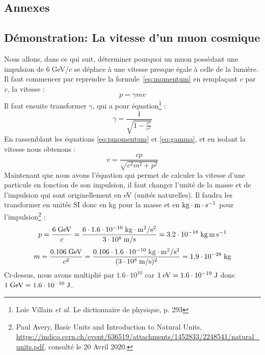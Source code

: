 \documentclass[a4paper, 12pt]{article}
\begin{document}
\begin{spacing}{1.5}
\pagebreak
\appendix
\section{Annexes}

\subsection{Démonstration: La vitesse d'un muon cosmique}
\label{annexe 1}

Nous allons, dans ce qui suit, déterminer pourquoi un muon possèdant une impulsion de $6\;$GeV/$c$ se déplace à une vitesse presque égale à celle de la lumière. Il faut commencer par reprendre la formule~\ref{eq:momentum} en remplaçant $c$ par $v$, la vitesse :
\begin{equation}
p = \gamma mv \label{eq:pmomentum}
\end{equation}
Il faut ensuite transformer $\gamma$, qui a pour équation\footnote{Loïc Villain \emph{et al.} Le dictionnaire de physique, p. 293} :
\begin{equation}
\gamma = \frac{1}{\sqrt{1 - \frac{v^2}{c^2}}} \label{eq:gamma}
\end{equation}
En rassemblant les équations \ref{eq:pmomentum} et \ref{eq:gamma}, et en isolant la vitesse nous obtenons :
\begin{equation}
v = \frac{cp}{\sqrt{c^2m^2+p^2}} \label{eq:vannexe1}
\end{equation}
Maintenant que nous avons l'équation qui permet de calculer la vitesse d'une particule en fonction de son impulsion, il faut changer l'unité de la masse et de l'impulsion qui sont originellement en eV (unités naturelles). Il faudra les transformer en unités SI donc en kg pour la masse et en ${\rm kg\cdot m\cdot s^{-1}}$ pour l'impulsion\footnote{Paul Avery, Basic Units and Introduction to Natural Units, \url{https://indico.cern.ch/event/636519/attachments/1452833/2248541/natural_units.pdf}, consulté le 20 Avril 2020.} :
\begin{equation}
p = \frac{6 \;{\rm GeV}}{c} = \frac{6\cdot 1.6\cdot 10^{-10}\;{\rm kg\cdot m^2 / s^2}}{3\cdot 10^8\;{\rm m/s}} = 3.2\cdot 10^{-18}\; {\rm kg\,m\,s^{-1}} \label{eq:change1}
\end{equation}
\begin{equation}
m = \frac{0.106 \;{\rm GeV}}{c^2} = \frac{0.106\cdot 1.6\cdot 10^{-10}\;{\rm kg\cdot m^2 / s^2}}{(3\cdot 10^8\;{\rm m/s})^2} = 1.9\cdot 10^{-28}\; {\rm kg} \label{eq:change2}
\end{equation}
Ci-dessus, nous avons multiplié par $1.6\cdot10^{10}$ car $1\;{\rm eV} = 1.6\cdot10^{-19}\;{\rm J}$ donc $1\;{\rm GeV} = 1.6\cdot10^{-10}\;{\rm J}$.


\end{spacing}
\end{document}
